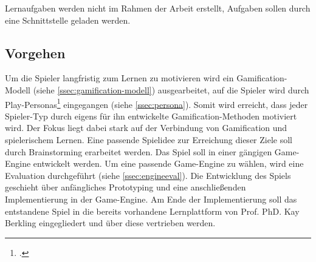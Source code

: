 	Lernaufgaben werden nicht im Rahmen der Arbeit erstellt, Aufgaben sollen durch eine Schnittstelle geladen werden.

\subsection{Vorgehen}
	Um die Spieler langfristig zum Lernen zu motivieren wird ein Gamification-Modell (siehe \ref{ssec:gamification-modell}) ausgearbeitet, auf die Spieler wird durch Play-Personas\footcite{persona} eingegangen (siehe \ref{ssec:persona}). Somit wird erreicht, dass jeder Spieler-Typ durch eigens für ihn entwickelte Gamification-Methoden motiviert wird. Der Fokus liegt dabei stark auf der Verbindung von Gamification und spielerischem Lernen.
	Eine passende Spielidee zur Erreichung dieser Ziele soll durch Brainstorming erarbeitet werden.
	Das Spiel soll in einer gängigen Game-Engine entwickelt werden. Um eine passende Game-Engine zu wählen, wird eine Evaluation durchgeführt (siehe \ref{ssec:engineeval}).
	Die Entwicklung des Spiels geschieht über anfängliches Prototyping und eine anschließenden Implementierung in der Game-Engine. Am Ende der Implementierung soll das entstandene Spiel in die bereits vorhandene Lernplattform von Prof. PhD. Kay Berkling eingegliedert und über diese vertrieben werden.

